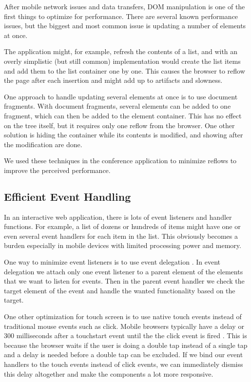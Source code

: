 After mobile network issues and data transfers, DOM manipulation is
one of the first things to optimize for performance. There are several
known performance issues, but the biggest and most common issue is
updating a number of elements at once. \cite{zakas2010high}

The application might, for example, refresh the contents of a list,
and with an overly simplistic (but still common) implementation would
create the list items and add them to the list container one by
one. This causes the browser to reflow the page after each insertion
and might add up to  artifacts and slowness.

One approach to handle updating several elements at once is to use
document fragments. With document fragments, several elements can be
added to one fragment, which can then be added to the element
container. This has no effect on the  tree itself, but it
requires only one reflow from the browser. One other solution is
hiding the container while its contents is modified, and showing after
the modification are done. \cite{zakas2010high}

We used these techniques in the conference application to minimize
 reflows to improve the perceived performance.

\subsection{Efficient Event Handling}

In an interactive web application, there is lots of event listeners
and handler functions. For example, a list of dozens or hundreds of
items might have one or even several event handlers for each item in
the list. This obviously becomes a burden especially in mobile devices
with limited processing power and memory.

One way to minimize event listeners is to use event delegation
\cite{zakas2010high}. In event delegation we attach only one event
listener to a parent element of the elements that we want to listen
for events. Then in the parent event handler we check the target
element of the event and handle the wanted functionality based on the
target.

One other optimization for touch screen is to use native touch events
instead of traditional mouse events such as click. Mobile browsers
typically have a delay or 300 milliseconds after a touchstart event
until the the click event is fired \citationneeded. This is because
the browser waits if the user is doing a double tap instead of a
single tap and a delay is needed before a double tap can be
excluded. If we bind our event handlers to the touch events instead of
click events, we can immediately dismiss this delay altogether and
make the  components a lot more responsive.

